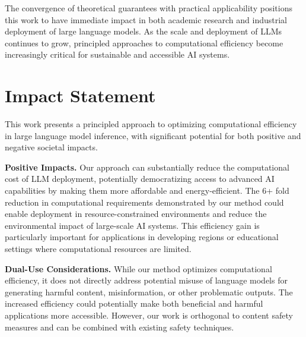 \documentclass{article}
\theoremstyle{plain}
\theoremstyle{definition}
\theoremstyle{remark}
\begin{document}
The convergence of theoretical guarantees with practical applicability positions this work to have immediate impact in both academic research and industrial deployment of large language models. As the scale and deployment of LLMs continues to grow, principled approaches to computational efficiency become increasingly critical for sustainable and accessible AI systems.


\section*{Impact Statement}
This work presents a principled approach to optimizing computational efficiency in large language model inference, with significant potential for both positive and negative societal impacts.

\textbf{Positive Impacts.} Our approach can substantially reduce the computational cost of LLM deployment, potentially democratizing access to advanced AI capabilities by making them more affordable and energy-efficient. The 6+ fold reduction in computational requirements demonstrated by our method could enable deployment in resource-constrained environments and reduce the environmental impact of large-scale AI systems. This efficiency gain is particularly important for applications in developing regions or educational settings where computational resources are limited.

\textbf{Dual-Use Considerations.} While our method optimizes computational efficiency, it does not directly address potential misuse of language models for generating harmful content, misinformation, or other problematic outputs. The increased efficiency could potentially make both beneficial and harmful applications more accessible. However, our work is orthogonal to content safety measures and can be combined with existing safety techniques.
\end{document}
